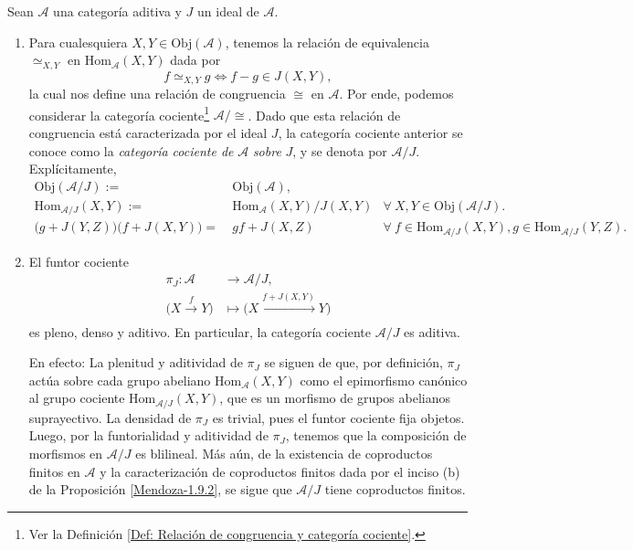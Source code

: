 \documentclass[tesis]{subfiles}
\begin{document}
\begin{Obs}\label{Obs: Ideal de una categoría aditiva}
    Sean $\mathscr{A}$ una categoría aditiva y $J$ un ideal de $\mathscr{A}$.

    \begin{enumerate}[label=(\arabic*)]
    
        \item Para cualesquiera $X,Y\in\text{Obj}(\mathscr{A})$, tenemos la relación de equivalencia $\simeq_{X,Y}$ en $\text{Hom}_\mathscr{A}(X,Y)$ dada por
            \[
                f \simeq_{X,Y} g \iff f-g \in J(X,Y),
            \] 
            la cual nos define una relación de congruencia $\cong$ en $\mathscr{A}$. Por ende, podemos considerar la categoría cociente\footnote{Ver la Definición \ref{Def: Relación de congruencia y categoría cociente}.} $\mathscr{A}/\cong$. Dado que esta relación de congruencia está caracterizada por el ideal $J$, la categoría cociente anterior se conoce como la \emph{categoría cociente de} $\mathscr{A}$ \emph{sobre} $J$, y se denota por $\mathscr{A}/J$. Explícitamente,
            \begin{align*}
                \text{Obj}(\mathscr{A}/J) :=& \ \text{Obj}(\mathscr{A}), \\
                \text{Hom}_{\mathscr{A}/J}(X,Y) :=& \ \text{Hom}_\mathscr{A}(X,Y)/J(X,Y) &\forall \ X,Y\in\text{Obj}(\mathscr{A}/J). \\
                \big(g + J(Y,Z)\big)\big(f + J(X,Y)\big) =& \ gf + J(X,Z)  &\forall \ f\in\text{Hom}_{\mathscr{A}/J}(X,Y), g\in\text{Hom}_{\mathscr{A}/J}(Y,Z).
            \end{align*}

        \item El funtor cociente
                \begin{align*}
                    \pi_J:\mathscr{A}&\to \mathscr{A}/J, \\
                    \big(X\xrightarrow[]{f}Y\big)&\mapsto \big(X\xrightarrow[]{f+J(X,Y)}Y\big)
                \end{align*}
                es pleno, denso y aditivo. En particular, la categoría cociente $\mathscr{A}/J$ es aditiva.

                En efecto: La plenitud y aditividad de $\pi_J$ se siguen de que, por definición, $\pi_J$ actúa sobre cada grupo abeliano $\text{Hom}_\mathscr{A}(X,Y)$ como el epimorfismo canónico al grupo cociente $\text{Hom}_{\mathscr{A}/J}(X,Y)$, que es un morfismo de grupos abelianos suprayectivo. La densidad de $\pi_J$ es trivial, pues el funtor cociente fija objetos. Luego, por la funtorialidad y aditividad de $\pi_J$, tenemos que la composición de morfismos en $\mathscr{A}/J$ es blilineal. Más aún, de la existencia de coproductos finitos en $\mathscr{A}$ y la caracterización de coproductos finitos dada por el inciso (b) de la Proposición \ref{Mendoza-1.9.2}, se sigue que $\mathscr{A}/J$ tiene coproductos finitos.


\end{enumerate}
\end{Obs}
\end{document}
